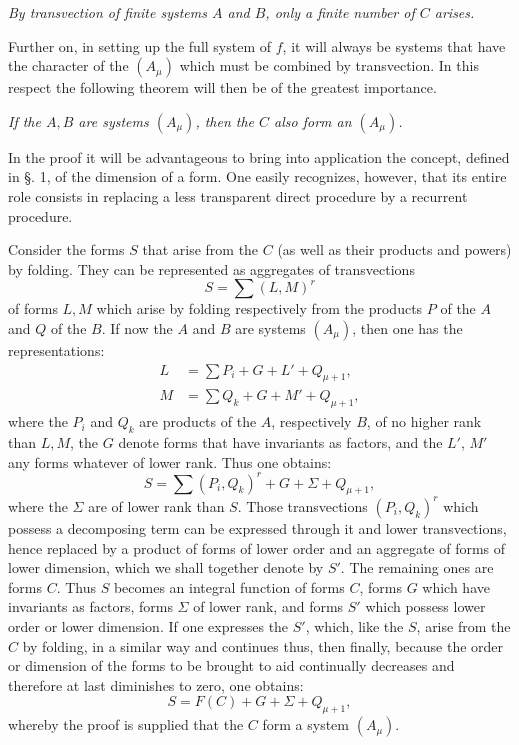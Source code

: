 \documentclass[10pt]{article}
\begin{document}
\emph{By transvection of finite systems $A$ and $B$, only a finite number of $C$ arises.}

Further on, in setting up the full system of $f$, it will always be systems that have the character of the $(A_\mu)$ which must be combined by transvection. In this respect the following theorem will then be of the greatest importance.

\emph{If the $A,B$ are systems $(A_\mu)$, then the $C$ also form an $(A_\mu)$.}

In the proof it will be advantageous to bring into application the concept, defined in §. 1, of the dimension of a form. One easily recognizes, however, that its entire role consists in replacing a less transparent direct procedure by a recurrent procedure.

Consider the forms $S$ that arise from the $C$ (as well as their products and powers) by folding. They can be represented as aggregates of transvections
\[
S=\sum(L,M)^r
\]
of forms $L,M$ which arise by folding respectively from the products $P$ of the $A$ and $Q$ of the $B$. If now the $A$ and $B$ are systems $(A_\mu)$, then one has the representations:
\[
\begin{aligned}
L&=\sum P_i+G+L'+Q_{\mu+1},\\
M&=\sum Q_k+G+M'+Q_{\mu+1},
\end{aligned}
\]
where the $P_i$ and $Q_k$ are products of the $A$, respectively $B$, of no higher rank than $L,M$, the $G$ denote forms that have invariants as factors, and the $L'$, $M'$ any forms whatever of lower rank. Thus one obtains:
\[
S=\sum(P_i,Q_k)^r+G+\Sigma+Q_{\mu+1},
\]
where the $\Sigma$ are of lower rank than $S$. Those transvections $(P_i,Q_k)^r$ which possess a decomposing term can be expressed through it and lower transvections, hence replaced by a product of forms of lower order and an aggregate of forms of lower dimension, which we shall together denote by $S'$. The remaining ones are forms $C$. Thus $S$ becomes an integral function of forms $C$, forms $G$ which have invariants as factors, forms $\Sigma$ of lower rank, and forms $S'$ which possess lower order or lower dimension. If one expresses the $S'$, which, like the $S$, arise from the $C$ by folding, in a similar way and continues thus, then finally, because the order or dimension of the forms to be brought to aid continually decreases and therefore at last diminishes to zero, one obtains:
\[
S=F(C)+G+\Sigma+Q_{\mu+1},
\]
whereby the proof is supplied that the $C$ form a system $(A_\mu)$.
\end{document}

